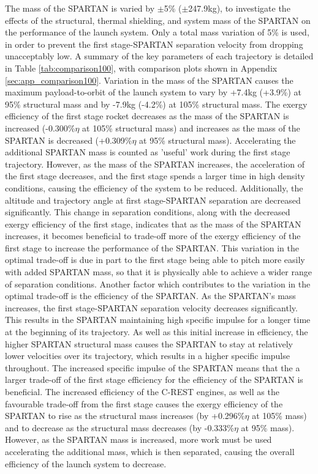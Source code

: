 The mass of the SPARTAN is varied by $\pm$5\% ($\pm$247.9kg), to investigate the effects of the structural, thermal shielding, and system mass of the SPARTAN on the performance of the launch system. Only a total mass variation of 5\% is used, in order to prevent the first stage-SPARTAN separation velocity from dropping unacceptably low. A summary of the key parameters of each trajectory is detailed in Table \ref{tab:comparison100}, with comparison plots shown in Appendix \ref{sec:app_comparison100}.
Variation in the mass of the SPARTAN causes the maximum payload-to-orbit of the launch system to vary by +7.4kg (+3.9\%) at 95\% structural mass and by -7.9kg (-4.2\%) at 105\% structural mass. 
The exergy efficiency of the first stage rocket decreases as the mass of the SPARTAN is increased (-0.300\%$\eta$  at 105\% structural mass) and increases as the mass of the SPARTAN is decreased (+0.309\%$\eta$  at 95\% structural mass). Accelerating the additional SPARTAN mass is counted as 'useful' work during the first stage trajectory. However, as the mass of the SPARTAN increases, the acceleration of the first stage decreases, and the first stage spends a larger time in high density conditions, causing the efficiency of the system to be reduced.
Additionally, the altitude and trajectory angle at first stage-SPARTAN separation are decreased significantly. This change in separation conditions, along with the decreased exergy efficiency of the first stage, indicates that as the mass of the SPARTAN increases, it becomes beneficial to trade-off more of the exergy efficiency of the first stage to increase the performance of the SPARTAN. This variation in the optimal trade-off is due in part to the first stage being able to pitch more easily with added SPARTAN mass, so that it is physically able to achieve a wider range of separation conditions. Another factor which contributes to the variation in the optimal trade-off is the efficiency of the SPARTAN. As the SPARTAN's mass increases, the first stage-SPARTAN separation velocity decreases significantly. This results in the SPARTAN maintaining high specific impulse for a longer time at the beginning of its trajectory. As well as this initial increase in efficiency, the higher SPARTAN structural mass causes the SPARTAN to stay at relatively lower velocities over its trajectory, which results in a higher specific impulse throughout. The increased specific impulse of the SPARTAN means that the a larger trade-off of the first stage efficiency for the efficiency of the SPARTAN is beneficial. 
The increased efficiency of the C-REST engines, as well as the favourable trade-off from the first stage causes the exergy efficiency of the SPARTAN to rise as the structural mass increases (by +0.296\%$\eta$ at 105\% mass) and to decrease as the structural mass decreases (by -0.333\%$\eta$ at 95\% mass). However, as the SPARTAN mass is increased, more work must be used accelerating the additional mass, which is then separated, causing the overall efficiency of the launch system to decrease. 


